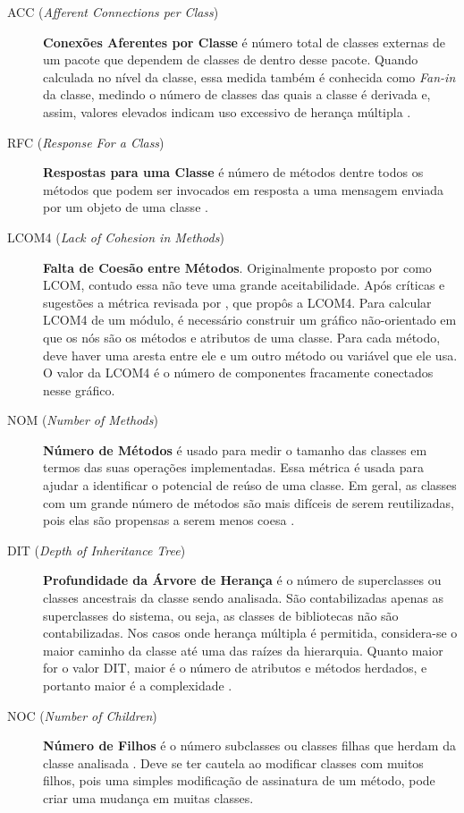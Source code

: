 \begin{description}

	\item[ACC (\textit{Afferent Connections per Class})] 
	\textbf{Conexões Aferentes por Classe} é número total de classes externas de 
	um pacote que dependem de classes de dentro desse pacote. Quando calculada 
	no nível da classe, essa medida também é conhecida como \textit{Fan-in} da 
	classe, medindo o número de classes das quais a classe é derivada e, assim, 
	valores elevados indicam uso excessivo de herança múltipla \cite{McCabe94} 
	\cite{Chidamber94}.
	
	
	\item[RFC (\textit{Response For a Class})] \textbf{Respostas para uma 
	Classe} é número de métodos dentre todos os métodos que podem ser invocados 
	em resposta a uma mensagem enviada por um objeto de uma classe 
	\cite{Sharble93}.
	
	\item[LCOM4 (\textit{Lack of Cohesion in Methods})] \textbf{Falta de Coesão
	entre Métodos}. Originalmente proposto por  
	como LCOM, contudo essa não teve uma grande aceitabilidade. Após críticas e 
	sugestões a métrica revisada por , que propôs a LCOM4. 
	Para calcular LCOM4 de um módulo, é necessário construir um gráfico 
	não-orientado em que os nós são os métodos e atributos de uma classe. Para 
	cada método, deve haver uma aresta entre ele e um outro método ou variável 
	que ele usa. O valor da LCOM4 é o número de componentes fracamente 
	conectados nesse gráfico. 

	
	\item[NOM (\textit{Number of Methods})] \textbf{Número de Métodos} é usado 
	para medir o tamanho das classes em termos das suas operações implementadas. 
	Essa métrica é usada para ajudar a identificar o potencial de reúso de uma 
	classe. Em geral, as classes com um grande número de métodos são mais 
	difíceis de serem reutilizadas, pois elas são propensas a serem menos coesa
	\cite{Lorenz94}.
	

	\item [DIT (\textit{Depth of Inheritance Tree})] \textbf{Profundidade da 
	Árvore de Herança} é o número de superclasses ou classes ancestrais da 
	classe sendo analisada. São contabilizadas apenas as superclasses do sistema, 
	ou seja, as classes de bibliotecas não são contabilizadas. Nos casos onde 
	herança múltipla é permitida, considera-se o maior caminho da classe até uma
	das raízes da hierarquia. Quanto maior for o valor DIT, maior é o número de 
	atributos e métodos herdados, e portanto maior é a complexidade 
	\cite{Shih97}.
	
	\item[NOC (\textit{Number of Children})] \textbf{Número de Filhos} é o 
	número subclasses ou classes filhas que herdam da classe analisada 
	\cite{Rosenberg97}. Deve se ter cautela ao modificar classes com muitos 
	filhos, pois uma simples modificação de assinatura de um método, pode criar
	uma mudança em muitas classes.
	

\end{description}
	
